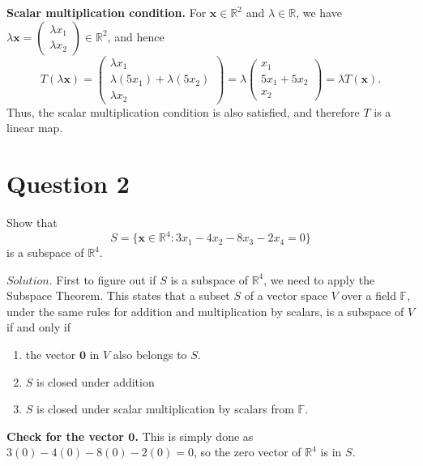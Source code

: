 \documentclass{article}
\begin{document}
\textbf{Scalar multiplication condition.} 
For $\mathbf{x} \in \mathbb{R}^2$ and $\lambda \in \mathbb{R}$, we have $\lambda \mathbf{x} =
\begin{pmatrix}
  \lambda x_1\\
  \lambda x_2
\end{pmatrix}
\in \mathbb{R}^2$, and hence
\begin{equation*}
  T(\lambda \mathbf{x}) = 
  \begin{pmatrix} 
    \lambda x_1 \\ 
    \lambda(5x_1) + \lambda(5x_2) \\ 
    \lambda x_2 
  \end{pmatrix}
  =
  \lambda\begin{pmatrix} 
     x_1 \\ 
    5x_1 + 5x_2 \\ 
     x_2 
  \end{pmatrix} = \lambda T(\mathbf{x}).
\end{equation*}
Thus, the scalar multiplication condition is also satisfied,
and therefore $T$ is a linear map.

\newpage
\section*{Question 2}
Show that
\begin{equation*}
  S = \{\mathbf{x} \in \mathbb{R}^4 : 3x_1-4x_2-8x_3-2x_4=0\}
\end{equation*}
is a subspace of $\mathbb{R}^4$.

$Solution.$ First to figure out if $S$ is a subspace of 
$\mathbb{R}^4$, we need to apply the Subspace Theorem. 
This states that a subset $S$ of a vector space $V$ over a field 
$\mathbb{F}$, under the same rules for addition and 
multiplication by scalars, is a subspace of $V$ if and only if
\begin{enumerate}[label=\roman*)]
  \item the vector $\mathbf{0}$ in $V$ also belongs to $S$.
  \item $S$ is closed under addition
  \item $S$ is closed under scalar multiplication 
  by scalars from $\mathbb{F}$.
\end{enumerate}

\textbf{Check for the vector $\mathbf{0}$.} This is simply done as
$3(0) - 4(0) - 8(0) - 2(0) = 0$, so the zero vector of 
$\mathbb{R}^4$ is in $S$.
\end{document}
